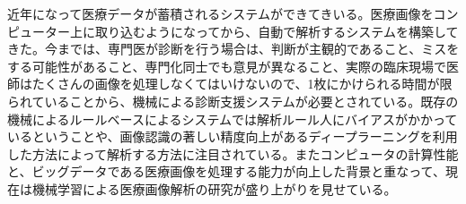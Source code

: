 近年になって医療データが蓄積されるシステムができてきいる。医療画像をコンピューター上に取り込むようになってから、自動で解析するシステムを構築してきた。今までは、専門医が診断を行う場合は、判断が主観的であること、ミスをする可能性があること、専門化同士でも意見が異なること、実際の臨床現場で医師はたくさんの画像を処理しなくてはいけないので、1枚にかけられる時間が限られていることから、機械による診断支援システムが必要とされている。既存の機械によるルールベースによるシステムでは解析ルール人にバイアスがかかっているということや、画像認識の著しい精度向上があるディープラーニングを利用した方法によって解析する方法に注目されている。またコンピュータの計算性能と、ビッグデータである医療画像を処理する能力が向上した背景と重なって、現在は機械学習による医療画像解析の研究が盛り上がりを見せている。